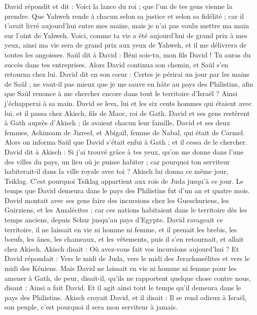 \begin{multicols}{2}
David répondit et dit : Voici la lance du roi ; que l'un de tes gens vienne la prendre.
Que Yahweh rende à chacun selon sa justice et selon sa fidélité ; car il t'avait livré aujourd'hui entre mes mains, mais je n'ai pas voulu mettre ma main sur l'oint de Yahweh.
Voici, comme ta vie a été aujourd'hui de grand prix à mes yeux, ainsi ma vie sera de grand prix aux yeux de Yahweh, et il me délivrera de toutes les angoisses.
Saül dit à David : Béni sois-tu, mon fils David ! Tu auras du succès dans tes entreprises. Alors David continua son chemin, et Saül s'en retourna chez lui.
\VerseOne{}David dit en son cœur : Certes je périrai un jour par les mains de Saül ; ne vaut-il pas mieux que je me sauve en hâte au pays des Philistins, afin que Saül renonce à me chercher encore dans tout le territoire d'Israël ? Ainsi j’échapperai à sa main.
David se leva, lui et les six cents hommes qui étaient avec lui, et il passa chez Akisch, fils de Maoc, roi de Gath.
David et ses gens restèrent à Gath auprès d’Akisch ; ils avaient chacun leur famille, David et ses deux femmes, Achinoam de Jizreel, et Abigaïl, femme de Nabal, qui était de Carmel.
Alors on informa Saül que David s'était enfui à Gath ; et il cessa de le chercher.
David dit à Akisch : Si j'ai trouvé grâce à tes yeux, qu'on me donne dans l'une des villes du pays, un lieu où je puisse habiter ; car pourquoi ton serviteur habiterait-il dans la ville royale avec toi ?
Akisch lui donna ce même jour, Tsiklag. C'est pourquoi Tsiklag appartient aux rois de Juda jusqu'à ce jour.
Le temps que David demeura dans le pays des Philistins fut d’un an et quatre mois.
David montait avec ses gens faire des incursions chez les Gueschuriens, les Guirziens, et les Amalécites ; car ces nations habitaient dans le territoire dès les temps anciens, depuis Schur jusqu'au pays d'Egypte.
David ravageait ce territoire, il ne laissait en vie ni homme ni femme, et il prenait les brebis, les bœufs, les ânes, les chameaux, et les vêtements, puis il s'en retournait, et allait chez Akisch.
Akisch disait : Où avez-vous fait vos incursions aujourd'hui ? Et David répondait : Vers le midi de Juda, vers le midi des Jerachmeélites et vers le midi des Kéniens.
Mais David ne laissait en vie ni homme ni femme pour les amener à Gath, de peur, disait-il, qu'ils ne rapportent quelque chose contre nous, disant : Ainsi a fait David. Et il agit ainsi tout le temps qu'il demeura dans le pays des Philistins.
Akisch croyait David, et il disait : Il se rend odieux à Israël, son peuple, c'est pourquoi il sera mon serviteur à jamais.

\end{multicols}
